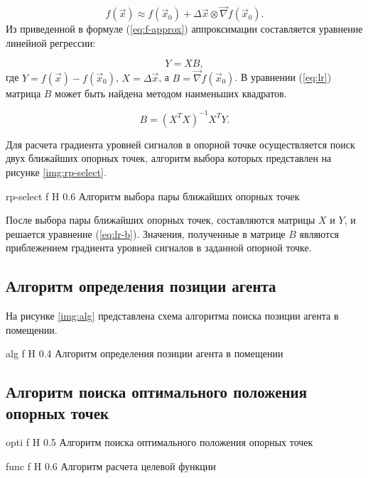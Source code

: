 \begin{equation}
    f(\vec{x}) \approx f(\vec{x}_0) + \Delta \vec{x} \otimes \vec{\nabla} f(\vec{x}_0).
    \label{eq:f-approx}
\end{equation}
Из приведенной в формуле (\ref{eq:f-approx}) аппроксимации составляется уравнение линейной регрессии:

\begin{equation}
    Y = XB,
    \label{eq:lr}
\end{equation}
где $Y = f(\vec{x}) - f (\vec{x}_0)$, $X = \Delta \vec{x}$, а $B = \vec{\nabla} f(\vec{x}_0)$. В уравнении (\ref{eq:lr}) матрица $B$ может быть найдена методом наименьших квадратов.

\begin{equation}
    B = (X^TX)^{-1}X^TY.
    \label{eq:lr-b}
\end{equation}

Для расчета градиента уровней сигналов в опорной точке осуществляется поиск двух ближайших опорных точек, алгоритм выбора которых представлен на рисунке \ref{img:rp-select}.

    {rp-select}
    {f}
    {H}
    {0.6\linewidth}
    {Алгоритм выбора пары ближайших опорных точек}

После выбора пары ближайших опорных точек, составляются матрицы $X$ и $Y$, и решается уравнение (\ref{eq:lr-b}). Значения, полученные в матрице $B$ являются приблежением градиента уровней сигналов в заданной опорной точке.

\subsection{Алгоритм определения позиции агента}

На рисунке \ref{img:alg} представлена схема алгоритма поиска позиции агента в помещении.

    {alg}
    {f}
    {H}
    {0.4\linewidth}
    {Алгоритм определения позиции агента в помещении}

\subsection{Алгоритм поиска оптимального положения опорных точек}

    {opti}
    {f}
    {H}
    {0.5\linewidth}
    {Алгоритм поиска оптимального положения опорных точек}

    {func}
    {f}
    {H}
    {0.6\linewidth}
    {Алгоритм расчета целевой функции}

